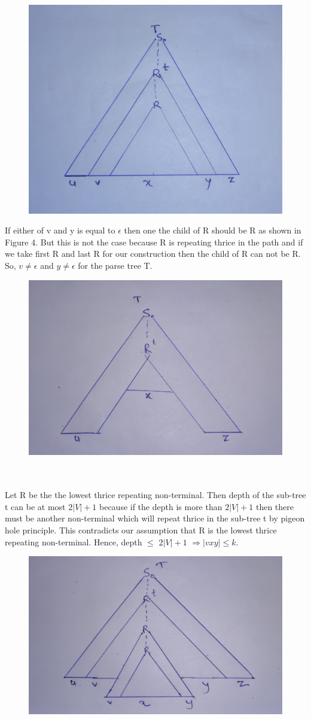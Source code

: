 \documentclass[11pt]{article}
\begin{document}
\begin{enumerate}
    \begin{figure}[!htb]
    \centering
    \includegraphics[width=0.5\linewidth]{graph/1.jpg}
    \caption{}
    \label{fig:7}
    \end{figure}
    
    If either of v and y is equal to $\epsilon$ then one the child of R should be R as shown in Figure 4. But this is not the case because R is repeating thrice in the path and if we take first R and last R for our construction then the child of R can not be R. So, $v \neq \epsilon$ and  $y \neq \epsilon$ for the parse tree T.
    \begin{figure}[!htb]
    \centering
    \includegraphics[width=0.5\linewidth]{graph/2.jpg}
    \caption{}
    \label{fig:6}
    \end{figure}
    \\\\
    Let R be the the lowest thrice repeating non-terminal. Then depth of the sub-tree t can be at most $2 \vert V \vert + 1$ because if the depth is more than $2 \vert V \vert + 1$ then there must be another non-terminal which will repeat thrice in the sub-tree t by pigeon hole principle. This contradicts our assumption that R is the lowest thrice repeating non-terminal. Hence, depth $\leq$ $2 \vert V \vert + 1$ $\Rightarrow \vert vxy \vert \leq k$.  
    \begin{figure}[!htb]
    \centering
    \includegraphics[width=0.5\linewidth]{graph/3.jpg}
    \caption{}
    \label{fig:6}
    \end{figure}


\end{enumerate}
\end{document}
